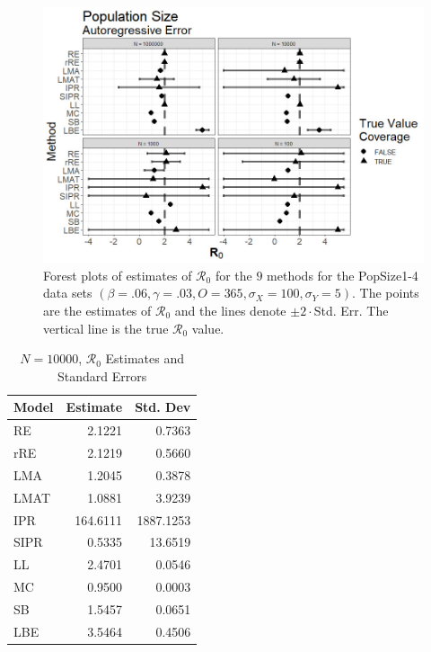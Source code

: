 \documentclass[12pt]{article}
\newcommand{\xxsir}{\ensuremath{9} } %
\newcommand{\rr}{\ensuremath{\mathcal{R}_0}}
\begin{document}
\begin{figure}[H]
	\centering
	\includegraphics[scale=0.5]{images/popsize_ar.jpg}
	\caption{Forest plots of estimates of $\rr$ for the \xxsir methods for the PopSize1-4 data sets $(\beta=.06, \gamma=.03, O=365, \sigma_X=100, \sigma_Y=5)$.  The points are the estimates of $\rr$ and the lines denote $\pm 2\cdot $Std. Err.  The vertical line is the true $\rr$ value.}
\end{figure}

\begin{table}[H]
	
	\centering
	\begin{tabular}[t]{l|r|r}
		\hline
		Model & Estimate & Std. Dev\\
		\hline
		RE & 2.1221 & 0.7363\\
		\hline
		rRE & 2.1219 & 0.5660\\
		\hline
		LMA & 1.2045 & 0.3878\\
		\hline
		LMAT & 1.0881 & 3.9239\\
		\hline
		IPR & 164.6111 & 1887.1253\\
		\hline
		SIPR & 0.5335 & 13.6519\\
		\hline
		LL & 2.4701 & 0.0546\\
		\hline
		MC & 0.9500 & 0.0003\\
		\hline
		SB & 1.5457 & 0.0651\\
		\hline
		LBE & 3.5464 & 0.4506\\
		\hline
	\end{tabular}
	\caption{$N = 10000$, $\rr$ Estimates and Standard Errors}
\end{table}
\end{document}
